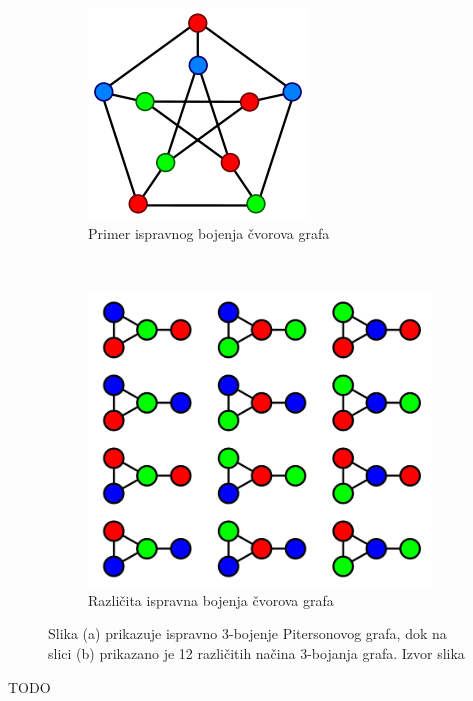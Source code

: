 \documentclass[a4paper]{article}
\begin{document}
\begin{figure}[h!]
	\centering

	\begin{subfigure}[normla]{0.3\textwidth}
		\includegraphics[scale=0.3]{bojene_grafa1}
		\caption{Primer ispravnog bojenja čvorova grafa}
		\label{bojenje_grafa1}
	\end{subfigure}
	~
	\begin{subfigure}[normla]{0.3\textwidth}
		\includegraphics[scale=0.1]{bojenje_grafa2}
		\caption{Različita ispravna bojenja čvorova grafa}
		\label{bojenje_grafa2}
	\end{subfigure}
		\caption{Slika (a) prikazuje ispravno 3-bojenje Pitersonovog grafa, dok na slici (b) prikazano je 12 različitih načina 3-bojanja grafa. Izvor slika \cite{graph_coloring} }
\label{bojene_grafa}
\end{figure}

TODO
\end{document}
